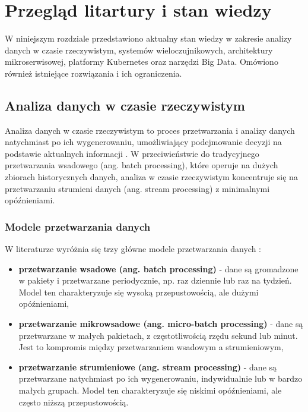 \section{Przegląd litartury i stan wiedzy}
\label{sec:przeglad_literatury}

W niniejszym rozdziale przedstawiono aktualny stan wiedzy w zakresie analizy danych w czasie rzeczywistym, systemów wieloczujnikowych,
architektury mikroserwisowej, platformy Kubernetes oraz narzędzi Big Data. Omówiono również istniejące rozwiązania i ich ograniczenia.

\subsection{Analiza danych w czasie rzeczywistym}
\label{subsec:analiza_danych}

Analiza danych w czasie rzeczywistym to proces przetwarzania i analizy danych natychmiast po ich wygenerowaniu,
umożliwiający podejmowanie decyzji na podstawie aktualnych informacji \citep{realtime_analytics}. W przeciwieństwie do tradycyjnego przetwarzania
wsadowego (ang. batch processing), które operuje na dużych zbiorach historycznych danych, analiza w czasie rzeczywistym koncentruje się na przetwarzaniu
strumieni danych (ang. stream processing) z minimalnymi opóźnieniami.

\subsubsection{Modele przetwarzania danych}
\label{subsubsec:modele_przetwarzania}

W literaturze wyróżnia się trzy główne modele przetwarzania danych \citep{data_processing_models}:

\begin{itemize}
    \item \textbf{przetwarzanie wsadowe (ang. batch processing)} - dane są gromadzone w pakiety i przetwarzane periodycznie, np. raz dziennie lub raz na tydzień. Model ten charakteryzuje się wysoką przepustowością, ale dużymi opóźnieniami,
    \item \textbf{przetwarzanie mikrowsadowe (ang. micro-batch processing)} - dane są przetwarzane w małych pakietach, z częstotliwością rzędu sekund lub minut. Jest to kompromis między przetwarzaniem wsadowym a strumieniowym,
    \item \textbf{przetwarzanie strumieniowe (ang. stream processing)} - dane są przetwarzane natychmiast po ich wygenerowaniu, indywidualnie lub w bardzo małych grupach. Model ten charakteryzuje się niskimi opóźnieniami, ale często niższą przepustowością.
\end{itemize}

